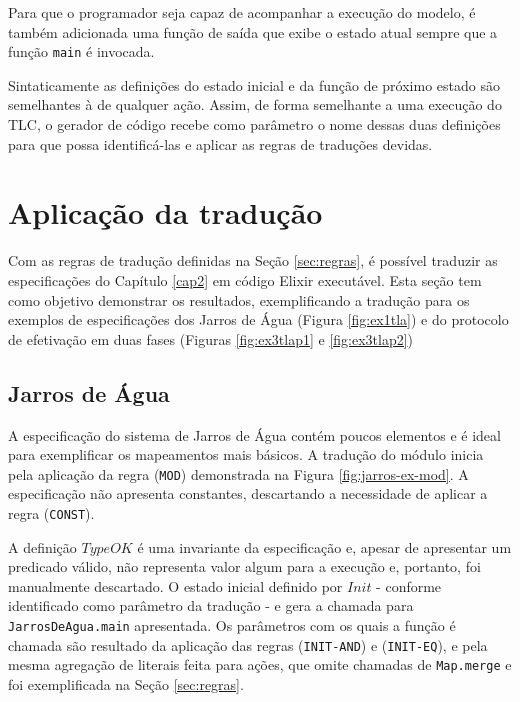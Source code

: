 Para que o programador seja capaz de acompanhar a execução do modelo, é também
adicionada uma função de saída que exibe o estado atual sempre que a função
\texttt{main} é invocada.



Sintaticamente as definições do estado inicial e da função de próximo estado são
semelhantes à de qualquer ação. Assim, de forma semelhante a uma execução do
TLC, o gerador de código recebe como parâmetro o nome dessas duas definições
para que possa identificá-las e aplicar as regras de traduções devidas.

\section{Aplicação da tradução}
\label{sec:validacao}

Com as regras de tradução definidas na Seção \ref{sec:regras}, é possível
traduzir as especificações do Capítulo \ref{cap2} em código Elixir executável.
Esta seção tem como objetivo demonstrar os resultados, exemplificando a tradução
para os exemplos de especificações dos Jarros de Água (Figura \ref{fig:ex1tla})
e do protocolo de efetivação em duas fases (Figuras \ref{fig:ex3tlap1} e
\ref{fig:ex3tlap2})

\subsection{Jarros de Água}


A especificação do sistema de Jarros de Água contém poucos elementos e é ideal
para exemplificar os mapeamentos mais básicos. A tradução do módulo inicia pela
aplicação da regra (\texttt{MOD}) demonstrada na Figura \ref{fig:jarros-ex-mod}.
A especificação não apresenta constantes, descartando a necessidade de aplicar a
regra (\texttt{CONST}).

A definição $TypeOK$ é uma invariante da especificação e, apesar de apresentar
um predicado válido, não representa valor algum para a execução e, portanto, foi
manualmente descartado. O estado inicial definido por $Init$ - conforme identificado como
parâmetro da tradução - e gera a chamada para \texttt{JarrosDeAgua.main}
apresentada. Os parâmetros com os quais a função é chamada são resultado da
aplicação das regras (\texttt{INIT-AND}) e (\texttt{INIT-EQ}), e pela mesma
agregação de literais feita para ações, que omite chamadas de \texttt{Map.merge}
e foi exemplificada na Seção \ref{sec:regras}.

